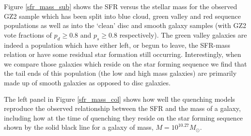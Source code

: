 \documentclass[useAMS,usenatbib]{mn2e}
\begin{document}
Figure \ref{sfr_mass_sub} shows the SFR versus the stellar mass for the observed GZ2 sample which has been split into blue cloud, green valley and red sequence populations as well as into the `clean' disc and smooth galaxy samples (with GZ2 vote fractions of $p_d \geq 0.8$ and $p_s \geq 0.8$ respectively). The green valley galaxies are indeed a population which have either left, or begun to leave, the SFR-mass relation or have some residual star formation still occurring. Interestingly, when we compare those galaxies which reside on the star forming sequence we find that the tail ends of this population (the low and high mass  galaxies) are primarily made up of smooth galaxies as opposed to disc galaxies.


The left panel in Figure \ref{sfr_mass_col} shows how well the quenching models reproduce the observed relationship between the SFR and the mass of a galaxy, including how at the time of quenching they reside on the star forming sequence shown by the solid black line for a galaxy of mass, $M = 10^{10.27} M_{\odot}$.  %
\end{document}
